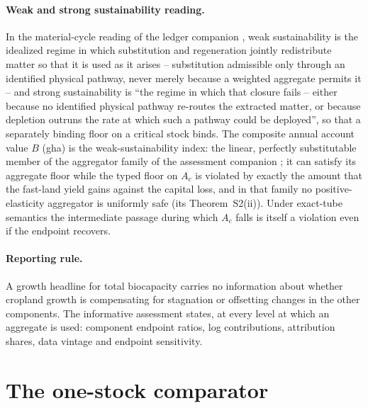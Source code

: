 \documentclass[11pt,a4paper]{article}
\begin{document}
\paragraph{Weak and strong sustainability reading.} In the material-cycle reading of the ledger companion \citep{Abaee2026c}, weak sustainability is the idealized regime in which substitution and regeneration jointly redistribute matter so that it is used as it arises -- substitution admissible only through an identified physical pathway, never merely because a weighted aggregate permits it -- and strong sustainability is ``the regime in which that closure fails -- either because no identified physical pathway re-routes the extracted matter, or because depletion outruns the rate at which such a pathway could be deployed'', so that a separately binding floor on a critical stock binds. The composite annual account value $B$ (gha) is the weak-sustainability index: the linear, perfectly substitutable member of the aggregator family of the assessment companion \citep[Lemma~A of][]{Abaee2026b}; it can satisfy its aggregate floor while the typed floor on $A_c$ is violated by exactly the amount that the fast-land yield gains against the capital loss, and in that family no positive-elasticity aggregator is uniformly safe (its Theorem~S2(ii)). Under exact-tube semantics the intermediate passage during which $A_c$ falls is itself a violation even if the endpoint recovers.

\paragraph{Reporting rule.} A growth headline for total biocapacity carries no information about whether cropland growth is compensating for stagnation or offsetting changes in the other components. The informative assessment states, at every level at which an aggregate is used: component endpoint ratios, log contributions, attribution shares, data vintage and endpoint sensitivity.

\section{The one-stock comparator}\label{si:onestock}
\end{document}
